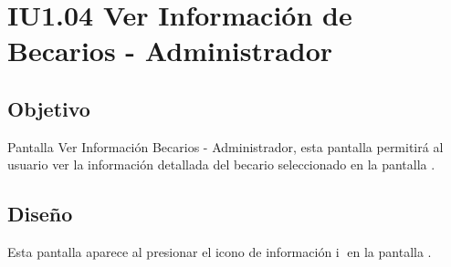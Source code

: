 \newpage
\section{IU1.04 Ver Información de Becarios - Administrador}

\subsection{Objetivo}
	Pantalla Ver Información Becarios - Administrador, esta pantalla permitirá al usuario  ver la información detallada del becario seleccionado en la pantalla .
	
	


\subsection{Diseño}
    Esta pantalla aparece al presionar el icono de información \textcircled{i} en la pantalla .

	
